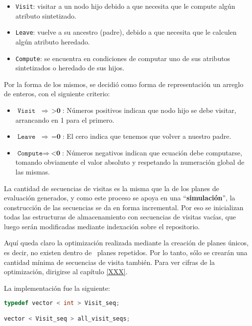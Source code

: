 \begin{itemize}
\item \texttt{Visit}: visitar a un nodo hijo debido a que necesita que le compute algún atributo sintetizado.
\item \texttt{Leave}: vuelve a su ancestro (padre), debido a que necesita que le calculen algún atributo heredado.
\item \texttt{Compute}: se encuentra en condiciones de computar uno de sus atributos sintetizados o heredado de sus hijos.
\end{itemize}

Por la forma de los mismos, se decidió como forma de representación un arreglo de enteros, con el siguiente criterio:

\begin{itemize}
\item $\texttt{Visit}\ \ \ \  \Rightarrow \ \ \textbf{>0}$: Números positivos indican que nodo hijo se debe visitar, arrancando en 1 para el primero.
\item $\texttt{Leave}\ \ \ \  \Rightarrow \ \ \textbf{=0}$: El cero indica que tenemos que volver a nuestro padre.
\item $\texttt{Compute} \Rightarrow \ \textbf{<0}$: Números negativos indican que ecuación debe computarse, tomando obviamente el valor absoluto y respetando la numeración global de las mismas.
\end{itemize}

La cantidad de secuencias de visitas es la misma que la de los planes de evaluación generados, y como este proceso se apoya en una ``\textbf{simulación}'', la construcción de las secuencias se da en forma incremental. Por eso se inicializan todas las estructuras de almacenamiento con secuencias de visitas vacías, que luego serán modificadas mediante indexación sobre el repositorio.

Aquí queda claro la optimización realizada mediante la creación de planes únicos, es decir, no existen dentro de \maggen\ planes repetidos. Por lo tanto, sólo se crearán una cantidad mínima de secuencias de visita también. Para ver cifras de la optimización, dirigirse al capítulo \ref{XXX}.

La implementación fue la siguiente:

\begin{lstlisting}[language=C++, basicstyle=\scriptsize, columns=fullflexible, linewidth=7cm]
typedef vector < int > Visit_seq;

vector < Visit_seq > all_visit_seqs;
\end{lstlisting}

